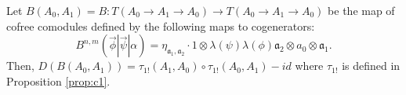 %
\begin{prop}
\label{prop:c2}
Let 
$B(A_0,A_1) = B:T(A_0 \to A_1 \to A_0)
\longrightarrow T(A_0 \to A_1 \to A_0)$ 
be the map of cofree comodules defined by 
the following maps to cogenerators:
\begin{equation}
\label{eq:def_sigma}
B^{n,m} (\vec{\phi} | \vec{\psi} | \alpha) 
= \eta_{\mathfrak{a}_1,\mathfrak{a}_2}\cdot
1 \otimes \lambda(\psi)\lambda(\phi) \mathfrak{a}_2 \otimes a_0 \otimes \mathfrak{a}_1.
\end{equation}
Then, $D(B(A_0,A_1)) = \tau_{1!}(A_1,A_0)\circ \tau_{1!}(A_0,A_1) - id$ where
$\tau_{1!}$ is defined in Proposition 
\ref{prop:c1}.
\end{prop}
%

